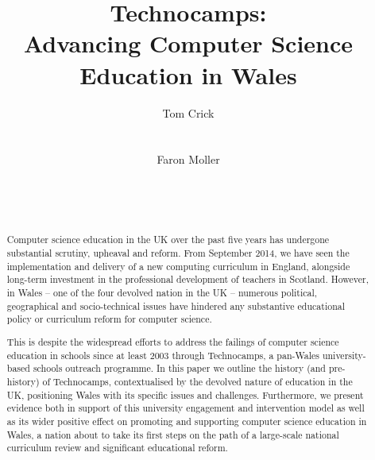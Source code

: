 \documentclass{sig-alternate}
\begin{document}
%

\title{Technocamps:\\[1ex] Advancing Computer Science Education in Wales}


\author{
\alignauthor
Tom Crick\\
\\
\\
\alignauthor
Faron Moller\\
\\
\\
\\
}

\maketitle

\begin{abstract}
Computer science education in the UK over the past five years has
undergone substantial scrutiny, upheaval and reform. From September
2014, we have seen the implementation and delivery of a new computing
curriculum in England, alongside long-term investment in the
professional development of teachers in Scotland. However, in Wales --
one of the four devolved nation in the UK -- numerous political,
geographical and socio-technical issues have hindered any substantive
educational policy or curriculum reform for computer science.

This is despite the widespread efforts to address the failings of
computer science education in schools since at least 2003 through
Technocamps, a pan-Wales university-based schools outreach
programme. In this paper we outline the history (and pre-history) of
Technocamps, contextualised by the devolved nature of education in the
UK, positioning Wales with its specific issues and
challenges. Furthermore, we present evidence both in support of this
university engagement and intervention model as well as its wider
positive effect on promoting and supporting computer science education
in Wales, a nation about to take its first steps on the path of a
large-scale national curriculum review and significant educational
reform.
\end{abstract}
\end{document}
